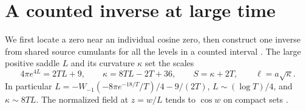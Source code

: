 \section{A counted inverse at large time}\label{sec:anchors}
We first locate a zero near an individual cosine zero, then construct one inverse from shared source cumulants for all the levels in a counted interval \cite{Founding07,Founding08}.
The large positive saddle \(L\)
and its curvature \(\kappa\) set the scales
\begin{equation}
 4\pi e^{4L}=2TL+9,\qquad \kappa=8TL-2T+36,\qquad S=\kappa+2T,\qquad \ell=a\sqrt\kappa .
 \label{eq:saddle}
\end{equation}
In particular \(L=-W_{-1}(-8\pi e^{-18/T}/T)/4-9/(2T)\), \(L\sim(\log T)/4\), and \(\kappa\sim 8TL\). The normalized field at \(z=w/L\) tends to \(\cos w\) on compact sets \cite[positive-time saddle and Appendix A]{Saddle}.

